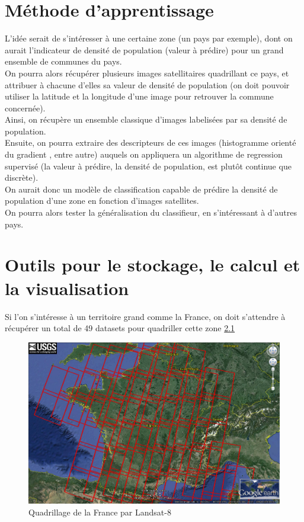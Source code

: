 \documentclass{book}
\begin{document}
\clearpage

\chapter{Méthode d'apprentissage}

L'idée serait de s'intéresser à une certaine zone (un pays par exemple), dont on aurait l'indicateur de densité de population (valeur 
à prédire) pour un grand ensemble de communes du pays.\\
On pourra alors récupérer plusieurs images satellitaires quadrillant ce pays, et attribuer à chacune d'elles
sa valeur de densité de population (on doit pouvoir utiliser la latitude et la longitude d'une image pour retrouver la commune concernée).\\
Ainsi, on récupère un ensemble classique d'images labelisées par sa densité de population.\\
Ensuite, on pourra extraire des descripteurs de ces images (histogramme orienté du gradient \cite{Dalal05histogramsof}, entre autre)
auquels on appliquera un algorithme de regression supervisé (la valeur à prédire, la densité de
population, est plut\^{o}t continue que discrète).\\
On aurait donc un modèle de classification capable de prédire la densité de population d'une zone en fonction d'images satellites.\\
On pourra alors tester la généralisation du classifieur, en s'intéressant à d'autres pays.\\

\chapter{Outils pour le stockage, le calcul et la visualisation}

Si l'on s'intéresse à un territoire grand comme la France, on doit s'attendre à récupérer un total de 49 datasets 
pour quadriller cette zone \ref{quadrillage}\\
\begin{figure}[H]
\begin{center}
\includegraphics[scale=0.25]{emrpise_france_landsat8.jpg}
\end{center}
\caption{Quadrillage de la France par Landsat-8 \cite{geosud}}
\label{quadrillage}
\end{figure}
\clearpage
\end{document}
